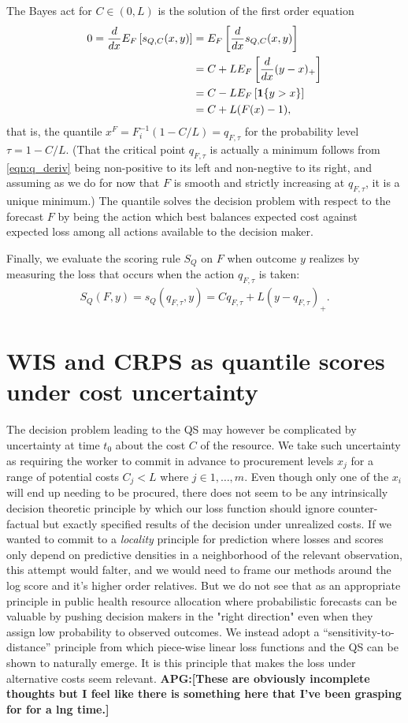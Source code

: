 \documentclass{article}
\def\apg#1{{\color{red}\textbf{APG:[#1]}}}
\begin{document}
The Bayes act for $C \in (0,L)$ is the solution of the first order equation 
\begin{align}
0 = \frac{d {} }{d {x}} E_F\left[s_{Q,C}(x,y)\right] &= E_F\left[\frac{d {} }{d {x}}s_{Q,C}(x,y)\right] \\
&= C + LE_F\left[\frac{d {} }{d {x}}(y-x)_+\right] \\
&= C - LE_F\left[\mathbf{1}\{y > x\}\right] \\
&= C + L(F(x) - 1), \label{eqn:q_deriv}
\end{align}
that is, the quantile $x^F = F_i^{-1}(1 - C/L) = q_{F,\tau}$ for the probability level $\tau = 1-C/L$. (That the critical point $q_{F,\tau}$ is actually a minimum follows from \eqref{eqn:q_deriv} being non-positive to its left and non-negtive to its right, and assuming as we do for now that $F$ is smooth and strictly increasing at $q_{F,\tau}$, it is a unique minimum.) The quantile solves the decision problem with respect to the forecast $F$ by being the action which best balances expected cost against expected loss among all actions available to the decision maker.

Finally, we evaluate the scoring rule $S_Q$ on $F$ when outcome $y$ realizes by measuring the loss that occurs when the action $q_{F,\tau}$ is taken:
\begin{align}
S_Q(F,y) = s_Q(q_{F,\tau}, y) = Cq_{F,\tau} + L(y- q_{F,\tau})_{+}.
\end{align}


\section{WIS and CRPS as quantile scores under cost uncertainty}

The decision problem leading to the QS may however be complicated by uncertainty at time $t_0$ about the cost $C$ of the resource. We take such uncertainty as requiring the worker to commit in advance to procurement levels $x_j$ for a range of potential costs $C_j < L$ where $j \in 1, \ldots, m$.  Even though only one of the $x_i$ will end up needing to be procured, there does not seem to be any intrinsically decision theoretic principle by which our loss function should ignore counter-factual but exactly specified results of the decision under unrealized costs. If we wanted to commit to a \emph{locality} principle for prediction where losses and scores only depend on predictive densities in a neighborhood of the relevant observation, this attempt would falter, and we would need to frame our methods around the log score and it's higher order relatives. But we do not see that as an appropriate principle in public health resource allocation where  
probabilistic forecasts can be valuable by pushing decision makers in the "right direction" even when they assign low probability to observed outcomes. We instead adopt a ``sensitivity-to-distance'' principle from which piece-wise linear loss functions and the QS can be shown to naturally emerge. It is this principle that makes the loss under alternative costs seem relevant. \apg{These are obviously incomplete thoughts but I feel like there is something here that I've been grasping for for a lng time.}
\end{document}
